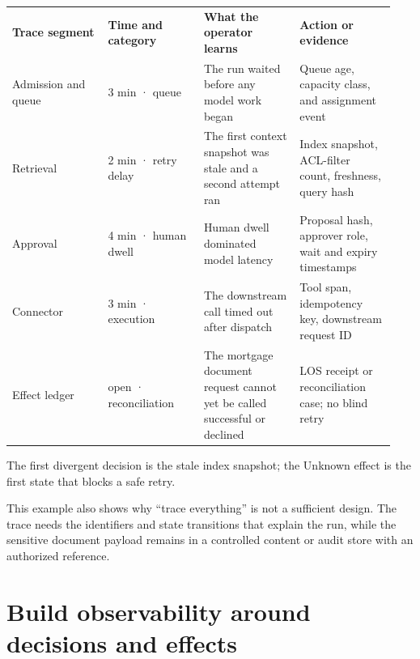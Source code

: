 \BookTableStart
\fontsize{7.2}{9}\selectfont
\begin{tabular}{@{}Y{0.2350\linewidth}Y{0.2350\linewidth}Y{0.2350\linewidth}Y{0.2350\linewidth}@{}}
\color{white}\bfseries \textbf{Trace segment} & \color{white}\bfseries \textbf{Time and category} & \color{white}\bfseries \textbf{What the operator learns} & \color{white}\bfseries \textbf{Action or evidence} \\
Admission and queue & 3 min · queue & The run waited before any model work began & Queue age, capacity class, and assignment event \\
Retrieval & 2 min · retry delay & The first context snapshot was stale and a second attempt ran & Index snapshot, ACL-filter count, freshness, query hash \\
Approval & 4 min · human dwell & Human dwell dominated model latency & Proposal hash, approver role, wait and expiry timestamps \\
Connector & 3 min · execution & The downstream call timed out after dispatch & Tool span, idempotency key, downstream request ID \\
Effect ledger & open · reconciliation & The mortgage document request cannot yet be called successful or declined & LOS receipt or reconciliation case; no blind retry \\
\end{tabular}
\BookTableEnd

The first divergent decision is the stale index snapshot; the Unknown effect is the first state that blocks a safe retry.\par

This example also shows why “trace everything” is not a sufficient design. The trace needs the identifiers and state transitions that explain the run, while the sensitive document payload remains in a controlled content or audit store with an authorized reference.\par

\section{Build observability around decisions and effects}

